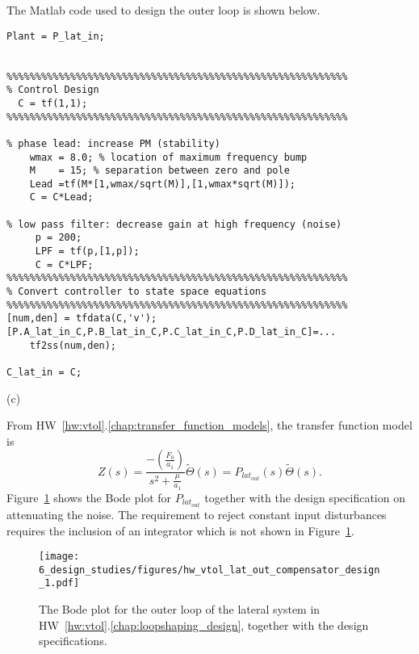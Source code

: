 The Matlab code used to design the outer loop is shown below.
\begin{lstlisting}
Plant = P_lat_in;


%%%%%%%%%%%%%%%%%%%%%%%%%%%%%%%%%%%%%%%%%%%%%%%%%%%%%%%%%%%
% Control Design
  C = tf(1,1);
%%%%%%%%%%%%%%%%%%%%%%%%%%%%%%%%%%%%%%%%%%%%%%%%%%%%%%%%%%%

% phase lead: increase PM (stability)
    wmax = 8.0; % location of maximum frequency bump
    M    = 15; % separation between zero and pole
    Lead =tf(M*[1,wmax/sqrt(M)],[1,wmax*sqrt(M)]);
    C = C*Lead;
    
% low pass filter: decrease gain at high frequency (noise)
     p = 200;
     LPF = tf(p,[1,p]);
     C = C*LPF;
%%%%%%%%%%%%%%%%%%%%%%%%%%%%%%%%%%%%%%%%%%%%%%%%%%%%%%%%%%%
% Convert controller to state space equations 
%%%%%%%%%%%%%%%%%%%%%%%%%%%%%%%%%%%%%%%%%%%%%%%%%%%%%%%%%%%
[num,den] = tfdata(C,'v');
[P.A_lat_in_C,P.B_lat_in_C,P.C_lat_in_C,P.D_lat_in_C]=...
    tf2ss(num,den);

C_lat_in = C;
\end{lstlisting}


(c)

From HW~\ref{hw:vtol}.\ref{chap:transfer_function_models}, the transfer function model is
\[
Z(s) = \frac{-\left(\frac{F_0}{a_1}\right)}{s^2 + \frac{\mu}{a_1}} \tilde{\Theta}(s) = P_{lat_{out}}(s)\tilde{\Theta}(s).
\]
Figure~\ref{fig:hw_vtol_lat_out_compensator_design_1} shows the Bode plot for $P_{lat_{out}}$ together with the design specification on attenuating the noise.  The requirement to reject constant input disturbances requires the inclusion of an integrator which is not shown in Figure~\ref{fig:hw_vtol_lat_out_compensator_design_1}.
%
\begin{figure}[H]
   \centering
   \texttt{[image: 6\_design\_studies/figures/hw\_vtol\_lat\_out\_compensator\_design\_1.pdf]}
   \caption{The Bode plot for the outer loop of the lateral system in HW~\ref{hw:vtol}.\ref{chap:loopshaping_design}, together with the design specifications.}
   \label{fig:hw_vtol_lat_out_compensator_design_1}
\end{figure}

